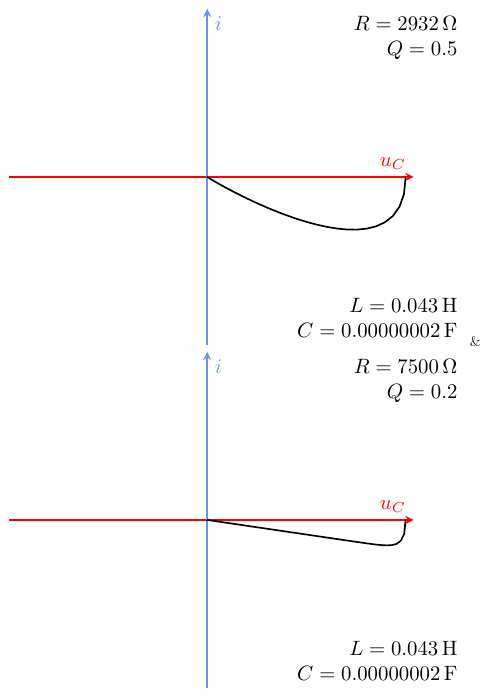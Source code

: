 \documentclass[../../main/main.tex]{subfiles}
\begin{document}
\begin{tcb}[label=ror:resumeamorti, tabularx={Y|Y|Y}]
	\includegraphics[width=\linewidth]{carac-rlc_xy-05} &
	\includegraphics[width=\linewidth]{carac-rlc_xy-02}
	\\\hline
\end{tcb}
\end{document}
